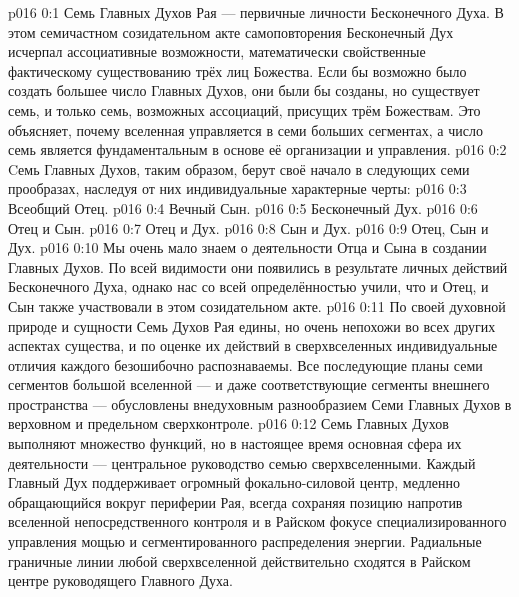 \author{Всеобщий Цензор}
\vs p016 0:1 Семь Главных Духов Рая --- первичные личности Бесконечного Духа. В этом семичастном созидательном акте самоповторения Бесконечный Дух исчерпал ассоциативные возможности, математически свойственные фактическому существованию трёх лиц Божества. Если бы возможно было создать большее число Главных Духов, они были бы созданы, но существует семь, и только семь, возможных ассоциаций, присущих трём Божествам. Это объясняет, почему вселенная управляется в семи больших сегментах, а число семь является фундаментальным в основе её организации и управления.
\vs p016 0:2 Cемь Главных Духов, таким образом, берут своё начало в следующих семи прообразах, наследуя от них индивидуальные характерные черты:
\vs p016 0:3 Всеобщий Отец.
\vs p016 0:4 Вечный Сын.
\vs p016 0:5 Бесконечный Дух.
\vs p016 0:6 Отец и Сын.
\vs p016 0:7 Отец и Дух.
\vs p016 0:8 Сын и Дух.
\vs p016 0:9 Отец, Сын и Дух.
\vs p016 0:10 \pc Мы очень мало знаем о деятельности Отца и Сына в создании Главных Духов. По всей видимости они появились в результате личных действий Бесконечного Духа, однако нас со всей определённостью учили, что и Отец, и Сын также участвовали в этом созидательном акте.
\vs p016 0:11 По своей духовной природе и сущности Семь Духов Рая едины, но очень непохожи во всех других аспектах существа, и по оценке их действий в сверхвселенных индивидуальные отличия каждого безошибочно распознаваемы. Все последующие планы семи сегментов большой вселенной --- и даже соответствующие сегменты внешнего пространства --- обусловлены внедуховным разнообразием Семи Главных Духов в верховном и предельном сверхконтроле.
\vs p016 0:12 Семь Главных Духов выполняют множество функций, но в настоящее время основная сфера их деятельности --- центральное руководство семью сверхвселенными. Каждый Главный Дух поддерживает огромный фокально\hyp{}силовой центр, медленно обращающийся вокруг периферии Рая, всегда сохраняя позицию напротив вселенной непосредственного контроля и в Райском фокусе специализированного управления мощью и сегментированного распределения энергии. Радиальные граничные линии любой сверхвселенной действительно сходятся в Райском центре руководящего Главного Духа.
